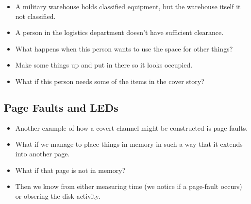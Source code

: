 \documentclass{beamer}
\begin{document}
\begin{frame}{\insertsubsectionhead}
  \begin{example}
    \begin{itemize}
      \item A military warehouse holds classified equipment, but the warehouse 
        itself it not classified.

      \item A person in the logistics department doesn't have sufficient 
        clearance.

      \item What happens when this person wants to use the space for other 
        things?

      \item Make some things up and put in there so it looks occupied.

      \item What if this person needs some of the items in the cover story?

    \end{itemize}
  \end{example}
\end{frame}

\subsection{Page Faults and LEDs}

\begin{frame}{\insertsubsectionhead}
  \begin{itemize}
    \item Another example of how a covert channel might be constructed is page 
      faults.

    \item What if we manage to place things in memory in such a way that it 
      extends into another page.

    \item What if that page is not in memory?

    \item Then we know from either measuring time (we notice if a page-fault 
      occurs) or obsering the disk activity.
  \end{itemize}
\end{frame}
\end{document}
